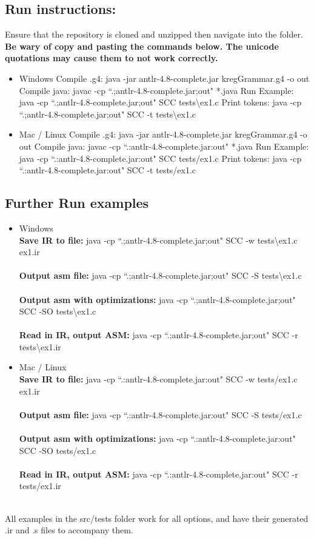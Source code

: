 \documentclass{article}
\begin{document}
\subsection{Run instructions:}
Ensure that the repository is cloned and unzipped then navigate into the folder.
{\bf Be wary of copy and pasting the commands below. The unicode quotations may cause them to not work correctly.}
\begin{itemize}
    \item Windows
        \subitem Compile .g4: java -jar antlr-4.8-complete.jar kregGrammar.g4 -o out
        \subitem Compile java: javac -cp ``.;antlr-4.8-complete.jar;out" *.java
        \subitem Run Example: java -cp ``.;antlr-4.8-complete.jar;out" SCC tests\textbackslash ex1.c
        \subitem Print tokens: java -cp ``.;antlr-4.8-complete.jar;out" SCC -t tests\textbackslash ex1.c
    \item Mac / Linux
        \subitem Compile .g4: java -jar antlr-4.8-complete.jar kregGrammar.g4 -o out
        \subitem Compile java: javac -cp ``.:antlr-4.8-complete.jar:out" *.java
        \subitem Run Example: java -cp ``.:antlr-4.8-complete.jar:out" SCC tests/ex1.c
        \subitem Print tokens: java -cp ``.:antlr-4.8-complete.jar:out" SCC -t tests/ex1.c
\end{itemize}

\subsection{Further Run examples}
\begin{itemize}
	\item Windows \\
		{\bf Save IR to file:} java -cp ``.;antlr-4.8-complete.jar;out" SCC -w tests\textbackslash ex1.c ex1.ir\\\\
		{\bf Output asm file:} java -cp ``.;antlr-4.8-complete.jar;out" SCC -S tests\textbackslash ex1.c\\\\
		{\bf Output asm with optimizations:} java -cp ``.;antlr-4.8-complete.jar;out" SCC -SO tests\textbackslash ex1.c\\\\
		{\bf Read in IR, output ASM:} java -cp ``.;antlr-4.8-complete.jar;out" SCC -r tests\textbackslash ex1.ir\\
	\item Mac / Linux \\
		{\bf Save IR to file:} java -cp ``.:antlr-4.8-complete.jar:out" SCC -w tests/ex1.c ex1.ir\\\\
		{\bf Output asm file:} java -cp ``.:antlr-4.8-complete.jar:out" SCC -S tests/ex1.c\\\\		
		{\bf Output asm with optimizations:} java -cp ``.:antlr-4.8-complete.jar:out" SCC -SO tests/ex1.c\\\\
		{\bf Read in IR, output ASM:} java -cp ``.:antlr-4.8-complete.jar:out" SCC -r tests/ex1.ir\\\\
\end{itemize}

All examples in the src/tests folder work for all options, and have their generated .ir and .s files to accompany them.
\end{document}

